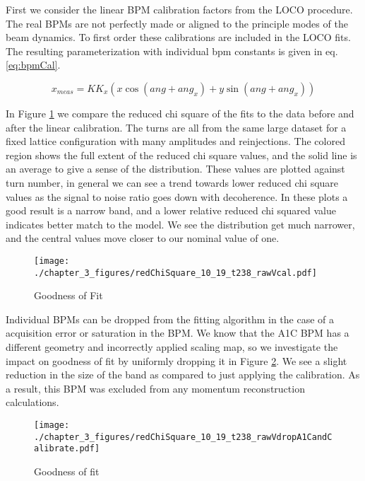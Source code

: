 First we consider the linear BPM calibration factors from the LOCO procedure. The real BPMs are not perfectly made or aligned to the principle modes of the beam dynamics. To first order these calibrations are included in the LOCO fits. The resulting parameterization with individual bpm constants is given in eq. \ref{eq:bpmCal}.

\begin{equation}
	x_{meas} = K K_{x} \left( x \cos(ang + ang_{x}) + y \sin(ang + ang_{x})\right)
	\label{eq:bpmCal}
\end{equation}

In Figure \ref{fig:rawVcal} we compare the reduced chi square of the fits to the data before and after the linear calibration. The turns are all from the same large dataset for a fixed lattice configuration with many amplitudes and reinjections. The colored region shows the full extent of the reduced chi square values, and the solid line is an average to give a sense of the distribution. These values are plotted against turn number, in general we can see a trend towards lower reduced chi square values as the signal to noise ratio goes down with decoherence. In these plots a good result is a narrow band, and a lower relative reduced chi squared value indicates better match to the model. We see the distribution get much narrower, and the central values move closer to our nominal value of one.

\begin{figure}
    \centering
    \texttt{[image: ./chapter\_3\_figures/redChiSquare\_10\_19\_t238\_rawVcal.pdf]}
    \caption{Goodness of Fit}
    \label{fig:rawVcal}
\end{figure}

Individual BPMs can be dropped from the fitting algorithm in the case of a acquisition error or saturation in the BPM. We know that the A1C BPM has a different geometry and incorrectly applied scaling map, so we investigate the impact on goodness of fit by uniformly dropping it in Figure \ref{fig:rawVA1C}. We see a slight reduction in the size of the band as compared to just applying the calibration. As a result, this BPM was excluded from any momentum reconstruction calculations.

\begin{figure}
    \centering
    \texttt{[image: ./chapter\_3\_figures/redChiSquare\_10\_19\_t238\_rawVdropA1CandCalibrate.pdf]}
    \caption{Goodness of fit}
    \label{fig:rawVA1C}
\end{figure}

